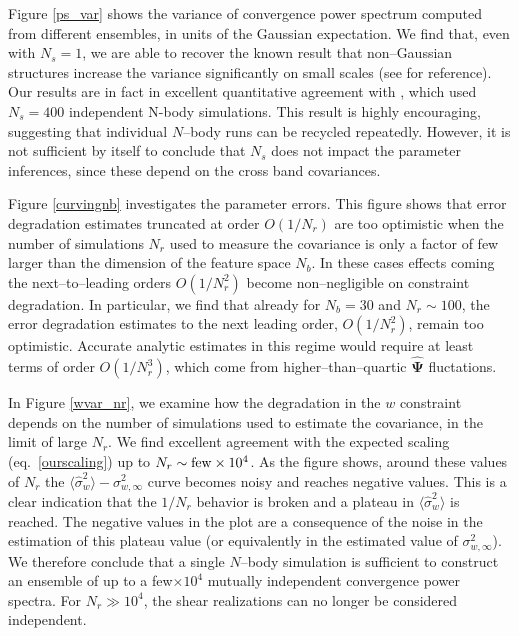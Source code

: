 \documentclass[reprint,aps,prd,superscriptaddress,showkeys,showpacs]{revtex4-1}
\newcommand{\bbh}[1]{\mathbf{\hat{#1}}}
\begin{document}
Figure \ref{ps_var} shows the variance of convergence power spectrum
computed from different ensembles, in units of the Gaussian
expectation. We find that, even with $N_s=1$, we are able to recover
the known result that non--Gaussian structures increase the variance
significantly on small scales (see \citep{Sato12,TakadaSpergel14} for
reference).  Our results are in fact in excellent quantitative
agreement with \citep{Sato12}, which used $N_s=400$ independent N-body
simulations.  This result is highly encouraging, suggesting that
individual $N$--body runs can be recycled repeatedly.  However, it is
not sufficient by itself to conclude that $N_s$ does not impact the
parameter inferences, since these depend on the cross band
covariances.

Figure \ref{curvingnb} investigates the parameter errors. This figure
shows that error degradation estimates truncated at order $O(1/N_r)$
are too optimistic when the number of simulations $N_r$ used to
measure the covariance is only a factor of few larger than the
dimension of the feature space $N_b$. In these cases effects coming
the next--to--leading orders $O(1/N_r^2)$ become non--negligible on
constraint degradation. In particular, we find that already for
$N_b=30$ and $N_r\sim100$, the error degradation estimates to the next
leading order, $O(1/N_r^2)$, remain too optimistic. Accurate analytic
estimates in this regime would require at least terms of order
$O(1/N_r^3)$, which come from higher--than--quartic $\bbh{\Psi}$
fluctations.

In Figure \ref{wvar_nr}, we examine how the degradation in the $w$
constraint depends on the number of simulations used to estimate the
covariance, in the limit of large $N_r$. We find excellent agreement
with the expected scaling (eq.~\ref{ourscaling}) up to $N_r\sim {\rm
  few}\times10^4$. As the figure shows, around these values of $N_r$
the $\langle\hat{\sigma}^2_w\rangle - \sigma^2_{w,\infty}$ curve
becomes noisy and reaches negative values. This is a clear indication
that the $1/N_r$ behavior is broken and a plateau in
$\langle\hat{\sigma}^2_w\rangle$ is reached. The negative values in
the plot are a consequence of the noise in the estimation of this
plateau value (or equivalently in the estimated value of
$\sigma^2_{w,\infty}$).  We therefore conclude that a single $N$--body
simulation is sufficient to construct an ensemble of up to a
few$\times 10^4$ mutually independent convergence power spectra. For
$N_r\gg10^4$, the shear realizations can no longer be considered
independent.
\end{document}
